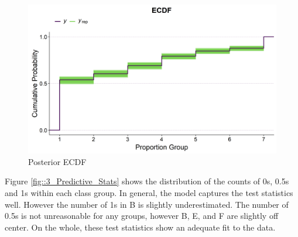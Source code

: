 \documentclass[11pt,twoside]{article}
\numberwithin{Theorem}{section}
\numberwithin{Definition}{section}
\numberwithin{Lemma}{section}
\numberwithin{Algorithm}{section}
\numberwithin{equation}{section}
\begin{document}
\begin{figure}[h!]
	\centering
	\includegraphics[height = 0.28\textheight]{Figures/3_1_Primary_PostPred_ECDF.png}
	\caption{Posterior ECDF} \label{fig::3_Predictive_ECDF}	
\end{figure}


Figure \ref{fig::3_Predictive_Stats} shows the distribution of the counts of 0s, 0.5s and 1s within each class group. In general, the model captures the test statistics well. However the number of 1s in B is slightly underestimated. The number of 0.5s is not unreasonable for any groups, however B, E, and F are slightly off center. On the whole, these test statistics show an adequate fit to the data. 
\end{document}
